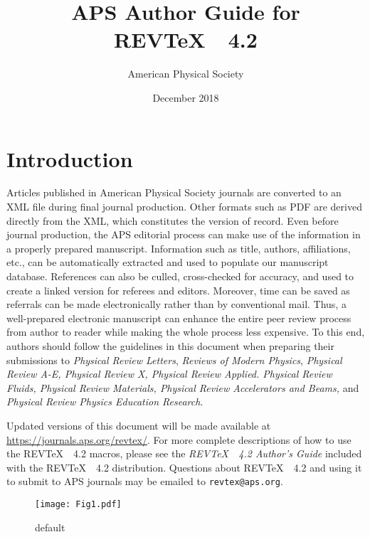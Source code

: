 \documentclass[twocolumn,secnumarabic,amssymb, nobibnotes, aps, prd]{revtex4-2}
\newcommand{\revtex}{REV\TeX\ }
\begin{document}
\title{APS Author Guide for \revtex~4.2}%

\author{American Physical Society}%
\date{December 2018}%
\maketitle
\tableofcontents

\section{Introduction}
Articles published in American Physical Society journals are converted to 
an XML file during final journal production. Other formats such
as PDF are derived directly from the XML, which constitutes the version of record. 
Even before journal production, the APS editorial process can make use
of the information in a properly prepared manuscript. Information such
as title, authors, affiliations, etc., can be automatically
extracted and used to populate our manuscript database. References can
also be culled, cross-checked for accuracy, and used to create a
linked version for referees and editors. Moreover, time can be saved
as referrals can be made electronically rather than by conventional
mail. Thus, a well-prepared electronic manuscript can enhance the
entire peer review process from author to reader while making the
whole process less expensive. To this end, authors should follow the
guidelines in this document when preparing their submissions to \textit{Physical Review Letters},
 \textit{Reviews of Modern Physics},  \textit{Physical Review A-E, Physical Review X, Physical Review Applied. Physical Review Fluids, Physical Review Materials, Physical Review Accelerators and Beams,} and \textit{Physical Review Physics Education Research}.
 
Updated versions of this document will be made available at  \url{https://journals.aps.org/revtex/}. For more complete
descriptions of how to use the \revtex\ 4.2 macros, please see the
\textit{\revtex~4.2 Author's Guide} included with the \revtex~4.2
distribution. Questions about \revtex\ 4.2 and using it to submit to APS journals may be
emailed to \texttt{revtex@aps.org}.

\begin{figure}[htbp]
\begin{center}
\texttt{[image: Fig1.pdf]}
\caption{default}
\label{default}
\end{center}
\end{figure}
\end{document}
